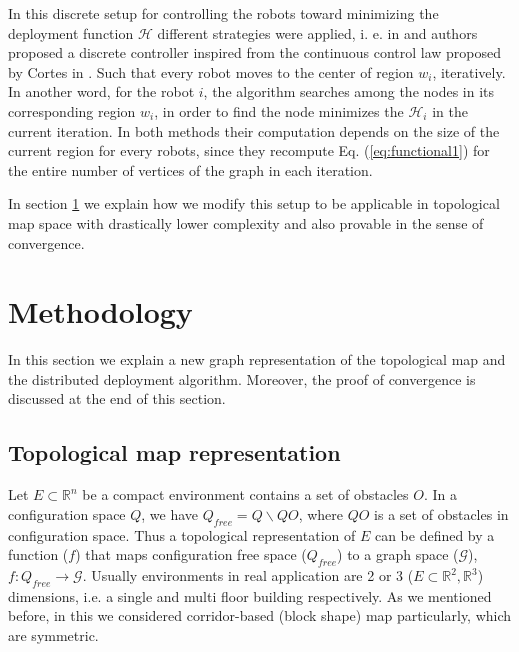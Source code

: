 \documentclass[twocolumn]{svjour3}       %
\begin{document}
In this discrete setup for controlling the robots toward minimizing the deployment function $\mathcal{H}$ different strategies were applied, i. e. in \cite{Durham2012} and \cite{Yun2013} authors proposed a discrete controller inspired from the continuous control law proposed by Cortes in \cite{Cortes2004}. Such that every robot moves to the center of region $w_i$, iteratively. In another word, for the robot $i$, the algorithm searches among the nodes in its corresponding region $w_i$, in order to find the node minimizes the $\mathcal{H}_i$ in the current iteration. In both methods their computation depends on the size of the current region for every robots, since they recompute Eq. (\ref{eq:functional1}) for the entire number of vertices of the graph in each iteration.

In section \ref{sec:methodology} we explain how we modify this setup to be applicable in topological map space with drastically lower complexity and also provable in the sense of convergence.


\section{Methodology}
\label{sec:methodology}


In this section we explain a new graph representation of the topological map and the distributed deployment algorithm. Moreover, the proof of convergence is discussed at the end of this section.

\subsection{Topological map representation}
\label{sec:topologymap}

Let $E \subset \mathbb{R}^n$ be a compact environment contains a set of obstacles $O$. In a configuration space $Q$, we have $Q_{free}=Q\backslash QO$, where $QO$ is a set of obstacles in configuration space. Thus a topological representation of $E$ can be defined by a function ($f$) that maps configuration free space ($Q_{free}$) to a graph space ($\mathcal{G}$), $f:Q_{free} \rightarrow \mathcal{G}$. Usually environments in real application are 2 or 3 ($E \subset \mathbb{R}^2, \mathbb{R}^3$) dimensions, i.e. a single and multi floor building respectively. As we mentioned before, in this we considered corridor-based (block shape) map particularly, which are symmetric.
\end{document}
